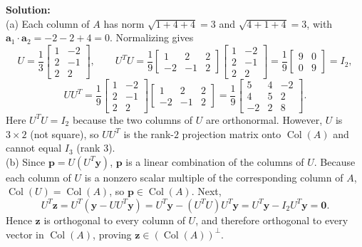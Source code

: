 \documentclass[11pt, letterpaper]{article}
\theoremstyle{definition}
\theoremstyle{remark}
\begin{document}
\textbf{Solution:} \\
(a) Each column of $A$ has norm $\sqrt{1 + 4 + 4} = 3$ and $\sqrt{4 + 1 + 4} = 3$, with $\mathbf{a}_1 \cdot \mathbf{a}_2 = -2 - 2 + 4 = 0$. Normalizing gives
\[
U = \frac{1}{3}\begin{bmatrix} 1 & -2 \\ 2 & -1 \\ 2 & 2 \end{bmatrix}, \qquad
U^T U = \frac{1}{9}\begin{bmatrix} 1 & 2 & 2 \\ -2 & -1 & 2 \end{bmatrix}\begin{bmatrix} 1 & -2 \\ 2 & -1 \\ 2 & 2 \end{bmatrix} = \frac{1}{9}\begin{bmatrix} 9 & 0 \\ 0 & 9 \end{bmatrix} = I_2,
\]
\[
U U^T = \frac{1}{9}\begin{bmatrix} 1 & -2 \\ 2 & -1 \\ 2 & 2 \end{bmatrix}\begin{bmatrix} 1 & 2 & 2 \\ -2 & -1 & 2 \end{bmatrix} = \frac{1}{9}\begin{bmatrix} 5 & 4 & -2 \\ 4 & 5 & 2 \\ -2 & 2 & 8 \end{bmatrix}.
\]
Here $U^T U = I_2$ because the two columns of $U$ are orthonormal. However, $U$ is $3 \times 2$ (not square), so $U U^T$ is the rank-$2$ projection matrix onto $\operatorname{Col}(A)$ and cannot equal $I_3$ (rank $3$). \\
(b) Since $\mathbf{p} = U(U^T \mathbf{y})$, $\mathbf{p}$ is a linear combination of the columns of $U$. Because each column of $U$ is a nonzero scalar multiple of the corresponding column of $A$, $\operatorname{Col}(U) = \operatorname{Col}(A)$, so $\mathbf{p} \in \operatorname{Col}(A)$. Next,
\[
U^T \mathbf{z} = U^T(\mathbf{y} - U U^T \mathbf{y}) = U^T \mathbf{y} - (U^T U)U^T \mathbf{y} = U^T \mathbf{y} - I_2 U^T \mathbf{y} = \mathbf{0}.
\]
Hence $\mathbf{z}$ is orthogonal to every column of $U$, and therefore orthogonal to every vector in $\operatorname{Col}(A)$, proving $\mathbf{z} \in (\operatorname{Col}(A))^\perp$. \\
\end{document}
